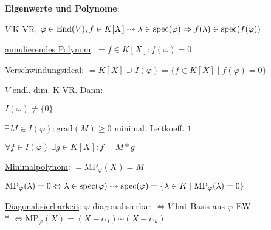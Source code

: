 \textbf{Eigenwerte und Polynome}:
\begin{items}
	\item $V$ K-VR, $\varphi \in \text{End}(V), f \in K[X] \\* \leadsto \lambda \in \text{spec}(\varphi) \Rightarrow f(\lambda) \in \text{spec}(f(\varphi))$
	\item \underline{annulierendes Polynom}: $=f \in K[X]: f(\varphi)=0$
	\item \underline{Verschwindungsideal}: $=K[X] \supseteq I(\varphi)=\{f \in K[X] \mid f(\varphi)=0 \}$
	\item $V$ endl.-dim. K-VR. Dann:
	\begin{enumeration}
		\item $I(\varphi) \neq \{ 0 \} $
		\item $\exists M \in I(\varphi): \text{grad}(M) \geq 0$ minimal, Leitkoeff. $1$
		\item $\forall f \in I(\varphi) \ \exists g \in K[X]: f=M*g $
	\end{enumeration}
	\item \underline{Minimalpolynom}: $= \text{MP}_\varphi(X)=M$
	\item $\text{MP}_\varphi(\lambda) = 0 \Leftrightarrow \lambda \in \text{spec}(\varphi) \\* \leadsto \text{spec}(\varphi) = \{ \lambda \in K \mid \text{MP}_\varphi(\lambda) = 0 \}$
	\item \underline{Diagonalisierbarkeit}: $\varphi$ diagonalisierbar $\Leftrightarrow V$ hat Basis aus $\varphi$-EW \\* $\Leftrightarrow \text{MP}_\varphi(X) = (X-\alpha_1)\cdots(X-\alpha_k)$
\end{items}